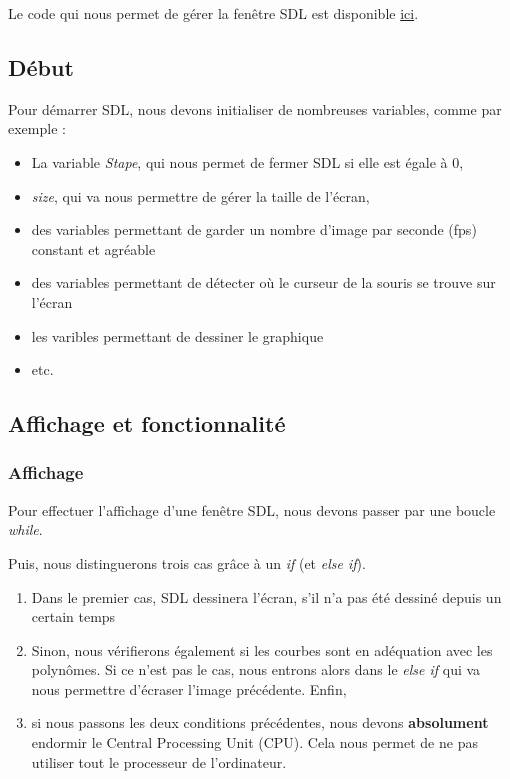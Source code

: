 \documentclass[letter]{article}
\begin{document}
Le code qui nous permet de gérer la fenêtre SDL est disponible \href{render.c}{ici}.

\subsection{Début}
\label{sec:org93d9819}

Pour démarrer SDL, nous devons initialiser de nombreuses variables, comme par exemple :

\begin{itemize}
\item La variable \emph{Stape}, qui nous permet de fermer SDL si elle est égale à 0,
\item \emph{size}, qui va nous permettre de gérer la taille de l'écran,
\item des variables permettant de garder un nombre d'image par seconde (fps) constant et agréable
\item des variables permettant de détecter où le curseur de la souris se trouve sur l'écran
\item les varibles permettant de dessiner le graphique
\item etc.
\end{itemize}




\subsection{Affichage et fonctionnalité}
\label{sec:org27bb6ce}

\subsubsection{Affichage}
\label{sec:org069e643}

Pour effectuer l'affichage d'une fenêtre SDL, nous devons passer par une boucle \emph{while}.

Puis, nous distinguerons trois cas grâce à un \emph{if} (et \emph{else if}).

\begin{enumerate}
\item Dans le premier cas, SDL dessinera l'écran, s'il n'a pas été dessiné depuis un certain temps
\item Sinon, nous vérifierons également si les courbes sont en adéquation avec les polynômes. Si ce n'est pas le cas, nous entrons alors dans le \emph{else if} qui va nous permettre d'écraser l'image précédente. Enfin,
\item si nous passons les deux conditions précédentes, nous devons \textbf{absolument} endormir le Central Processing Unit (CPU). Cela nous permet de ne pas utiliser tout le processeur de l'ordinateur.
\end{enumerate}
\end{document}
